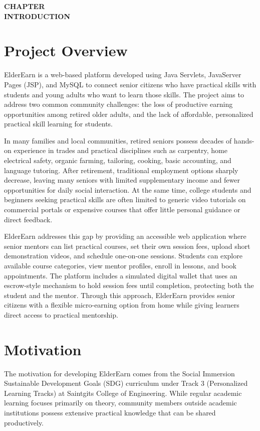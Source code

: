 \documentclass[12pt,a4paper]{report}
\newcommand{\chaptertitlepage}[1]{%
  \clearpage
  \thispagestyle{empty}
  \null
  \vfill
  \begin{center}
    {\fontsize{16pt}{18pt}\selectfont\bfseries CHAPTER \thechapter}\\[0.5cm]
    {\fontsize{16pt}{18pt}\selectfont\bfseries #1}
  \end{center}
  \vfill
  \null
  \clearpage
  \setcounter{section}{0}
}
\begin{document}
\pagestyle{maincontent}


\chaptertitlepage{INTRODUCTION}

\section{Project Overview}
ElderEarn is a web-based platform developed using Java Servlets, JavaServer Pages (JSP), and MySQL to connect senior citizens who have practical skills with students and young adults who want to learn those skills. The project aims to address two common community challenges: the loss of productive earning opportunities among retired older adults, and the lack of affordable, personalized practical skill learning for students.

In many families and local communities, retired seniors possess decades of hands-on experience in trades and practical disciplines such as carpentry, home electrical safety, organic farming, tailoring, cooking, basic accounting, and language tutoring. After retirement, traditional employment options sharply decrease, leaving many seniors with limited supplementary income and fewer opportunities for daily social interaction. At the same time, college students and beginners seeking practical skills are often limited to generic video tutorials on commercial portals or expensive courses that offer little personal guidance or direct feedback.

ElderEarn addresses this gap by providing an accessible web application where senior mentors can list practical courses, set their own session fees, upload short demonstration videos, and schedule one-on-one sessions. Students can explore available course categories, view mentor profiles, enroll in lessons, and book appointments. The platform includes a simulated digital wallet that uses an escrow-style mechanism to hold session fees until completion, protecting both the student and the mentor. Through this approach, ElderEarn provides senior citizens with a flexible micro-earning option from home while giving learners direct access to practical mentorship.

\section{Motivation}
The motivation for developing ElderEarn comes from the Social Immersion Sustainable Development Goals (SDG) curriculum under Track 3 (Personalized Learning Tracks) at Saintgits College of Engineering. While regular academic learning focuses primarily on theory, community members outside academic institutions possess extensive practical knowledge that can be shared productively.
\end{document}
